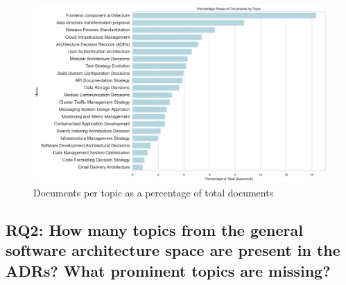         \begin{figure}[H]
            \centering
            \includegraphics[scale=0.4]{figures/percentage_topics.png}
            \caption{Documents per topic as a percentage of total documents}
            \label{fig:docs_per_topic_percentage}
        \end{figure}


        \subsection{RQ2: How many topics from the general software architecture space are present in the ADRs? What prominent topics are missing?}

